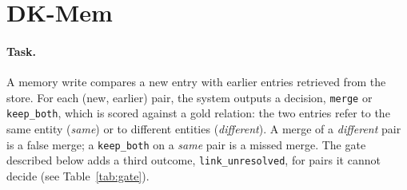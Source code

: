 \section{DK-Mem}
\label{sec:method}

\paragraph{Task.} A memory write compares a new entry with earlier entries retrieved from the store. For each (new, earlier) pair, the system outputs
a decision, \texttt{merge} or \texttt{keep\_both}, which is scored against a gold relation: the two entries refer to the same entity (\emph{same}) or to
different entities (\emph{different}). A merge of a \emph{different} pair is a false merge; a \texttt{keep\_both} on a \emph{same} pair is a missed merge.
The gate described below adds a third outcome, \texttt{link\_unresolved}, for pairs it cannot decide (see Table~\ref{tab:gate}).

